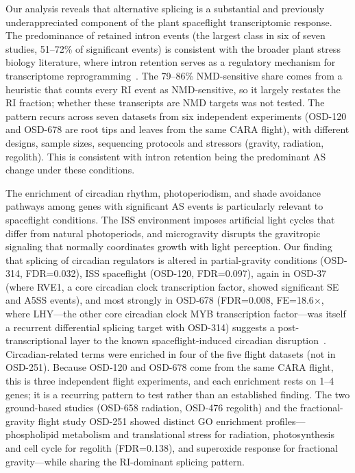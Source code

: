 \documentclass[12pt,a4paper]{article}
\begin{document}
Our analysis reveals that alternative splicing is a substantial and previously underappreciated component of the plant spaceflight transcriptomic response. The predominance of retained intron events (the largest class in six of seven studies, 51--72\% of significant events) is consistent with the broader plant stress biology literature, where intron retention serves as a regulatory mechanism for transcriptome reprogramming~\cite{kalyna2012, drechsel2013}. The 79--86\% NMD-sensitive share comes from a heuristic that counts every RI event as NMD-sensitive, so it largely restates the RI fraction; whether these transcripts are NMD targets was not tested. The pattern recurs across seven datasets from six independent experiments (OSD-120 and OSD-678 are root tips and leaves from the same CARA flight), with different designs, sample sizes, sequencing protocols and stressors (gravity, radiation, regolith). This is consistent with intron retention being the predominant AS change under these conditions.

The enrichment of circadian rhythm, photoperiodism, and shade avoidance pathways among genes with significant AS events is particularly relevant to spaceflight conditions. The ISS environment imposes artificial light cycles that differ from natural photoperiods, and microgravity disrupts the gravitropic signaling that normally coordinates growth with light perception. Our finding that splicing of circadian regulators is altered in partial-gravity conditions (OSD-314, FDR=0.032), ISS spaceflight (OSD-120, FDR=0.097), again in OSD-37 (where RVE1, a core circadian clock transcription factor, showed significant SE and A5SS events), and most strongly in OSD-678 (FDR=0.008, FE=18.6$\times$, where LHY---the other core circadian clock MYB transcription factor---was itself a recurrent differential splicing target with OSD-314) suggests a post-transcriptional layer to the known spaceflight-induced circadian disruption~\cite{solheim2021}. Circadian-related terms were enriched in four of the five flight datasets (not in OSD-251). Because OSD-120 and OSD-678 come from the same CARA flight, this is three independent flight experiments, and each enrichment rests on 1--4 genes; it is a recurring pattern to test rather than an established finding. The two ground-based studies (OSD-658 radiation, OSD-476 regolith) and the fractional-gravity flight study OSD-251 showed distinct GO enrichment profiles---phospholipid metabolism and translational stress for radiation, photosynthesis and cell cycle for regolith (FDR=0.138), and superoxide response for fractional gravity---while sharing the RI-dominant splicing pattern.
\end{document}
